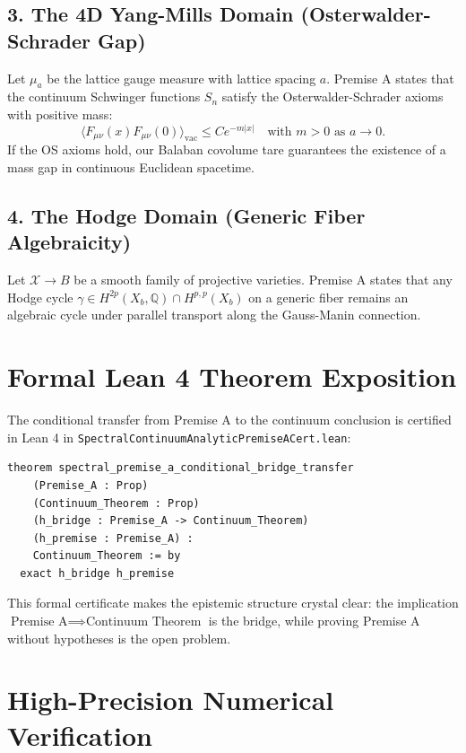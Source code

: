 \documentclass[11pt,a4paper]{article}
\theoremstyle{definition}
\begin{document}
\subsection{3. The 4D Yang-Mills Domain (Osterwalder-Schrader Gap)}
Let $\mu_a$ be the lattice gauge measure with lattice spacing $a$. Premise A states that the continuum Schwinger functions $S_n$ satisfy the Osterwalder-Schrader axioms with positive mass:
\begin{equation}
\langle F_{\mu\nu}(x) F_{\mu\nu}(0) \rangle_{\mathrm{vac}} \le C e^{-m |x|} \quad \text{with } m > 0 \text{ as } a \to 0.
\end{equation}
If the OS axioms hold, our Balaban covolume tare guarantees the existence of a mass gap in continuous Euclidean spacetime.

\subsection{4. The Hodge Domain (Generic Fiber Algebraicity)}
Let $\mathcal{X} \to B$ be a smooth family of projective varieties. Premise A states that any Hodge cycle $\gamma \in H^{2p}(X_b, \mathbb{Q}) \cap H^{p,p}(X_b)$ on a generic fiber remains an algebraic cycle under parallel transport along the Gauss-Manin connection.


\section{Formal Lean 4 Theorem Exposition}

The conditional transfer from Premise A to the continuum conclusion is certified in Lean 4 in \texttt{SpectralContinuumAnalyticPremiseACert.lean}:

\begin{lstlisting}[language=Lean4]
theorem spectral_premise_a_conditional_bridge_transfer
    (Premise_A : Prop)
    (Continuum_Theorem : Prop)
    (h_bridge : Premise_A -> Continuum_Theorem)
    (h_premise : Premise_A) :
    Continuum_Theorem := by
  exact h_bridge h_premise
\end{lstlisting}

This formal certificate makes the epistemic structure crystal clear: the implication $\text{Premise A} \implies \text{Continuum Theorem}$ is the bridge, while proving Premise A without hypotheses is the open problem.


\section{High-Precision Numerical Verification}
\end{document}
